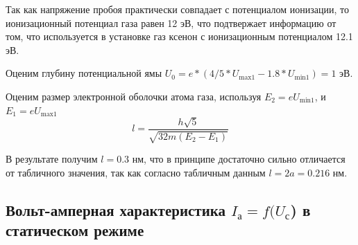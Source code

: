 \documentclass[12pt]{article}
\begin{document}
\par
	Так как напряжение пробоя практически совпадает с потенциалом ионизации, то ионизационный потенциал газа равен 12 эВ, что подтвержает информацию от том, что используется в установке газ ксенон с ионизационным потенциалом 12.1 эВ.
\par
	Оценим глубину потенциальной ямы $U_0 = e * (4/5 * U_\text{max1} - 1.8 * U_\text{min1}) =  1 $ эВ.
\par
	Оценим размер электронной оболочки атома газа, используя $E_2 = e U_\text{min1}$, и $E_1 = e U_\text{max1}$
\[
	l = \frac{h \sqrt{5}}{\sqrt{32m (E_2 - E_1)}}
\]
\par
	В результате получим $l = 0.3$ нм, что в принципе достаточно сильно отличается от табличного значения, так как согласно табличным данным $l = 2a = 0.216$ нм.  

\subsection*{Вольт-амперная характеристика $I_\text{а} = f(U_\text{с}$) в статическом режиме}
\end{document}
